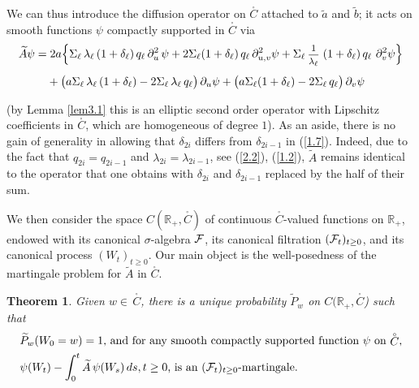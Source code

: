 \documentclass[12pt,leqno]{article}
\def\IR{{\mathbb R}}
\def\n{\noindent}
\def\dis{\displaystyle}
\def\f{\footnotesize}
\def\wt{\widetilde}
\def\cF{{\cal F}}
\newtheorem{theorem}{Theorem}[section]
\begin{document}
We can thus introduce the diffusion operator on $\stackrel{_\circ}{C}$ attached to $\wt{a}$ and $\wt{b}$; it acts on smooth functions $\psi$ compactly supported in $\stackrel{_\circ}{C}$ via
\begin{equation}\label{3.6}
\begin{split}
\wt{A} \psi = & \; 2a \Big\{\Sigma_\ell \, \lambda_\ell \,(1 + \delta_\ell) \,q_\ell \, \partial^2_u \, \psi + 2 \Sigma_\ell (1 + \delta_\ell) \,q_\ell \,\partial^2_{u,v} \psi + \Sigma_\ell \, \mbox{\f $\dis\frac{1}{\lambda_\ell}$} \; (1 + \delta_\ell) \,q_\ell \ \partial^2_v \psi\Big\}
\\[1ex]
& +  \big(a \Sigma_\ell \, \lambda_\ell \,(1 + \delta_\ell)  - 2 \Sigma_\ell \,\lambda_\ell \, q_\ell\big) \, \partial_u \psi + \big( a \Sigma_\ell (1 + \delta_\ell) - 2 \Sigma_\ell \,q_\ell \big) \,\partial_v \psi
\end{split}
\end{equation}

\n
(by Lemma \ref{lem3.1} this is an elliptic second order operator with Lipschitz coefficients in $\stackrel{_\circ}{C}$, which are homogeneous of degree $1$). As an aside, there is no gain of generality in allowing that $\delta_{2i}$ differs from $\delta_{2i-1}$ in (\ref{1.7}). Indeed, due to the fact that $q_{2i} = q_{2i-1}$ and $\lambda_{2i} = \lambda_{2i-1}$, see (\ref{2.2}), (\ref{1.2}), $\wt{A}$ remains identical to the operator that one obtains with $\delta_{2i}$ and $\delta_{2i-1}$ replaced by the half of their sum.

\medskip
We then consider the space $C(\IR_+, \stackrel{_\circ}{C})$ of continuous $\stackrel{_\circ}{C}$-valued functions on $\IR_+$, endowed with its canonical $\sigma$-algebra $\cF$, its canonical filtration $(\cF_t)_{t \ge 0}$, and its canonical process $(W_t)_{t \ge 0}$. Our main object is the well-posedness of the martingale problem for $\wt{A}$ in $\stackrel{_\circ}{C}$.
\begin{theorem}\label{theo3.2}
Given $w \in\, \stackrel{_\circ}{C}$, there is a unique probability $\wt{P}_w$ on $C(\IR_+, \stackrel{_\circ}{C}$) such that
\begin{equation}\label{3.7}
\begin{array}{l}
\mbox{$\wt{P}_w (W_0 = w) = 1$, and for any smooth compactly supported function $\psi$ on $\stackrel{_\circ}{C}$},
\\[1ex]
\mbox{$\psi(W_t) - \dis\int^t_0 \wt{A} \, \psi (W_s)\, ds, t \ge 0$, is an $(\cF_t)_{t \ge 0}$-martingale}.
\end{array}
\end{equation}
\end{theorem}
\end{document}
